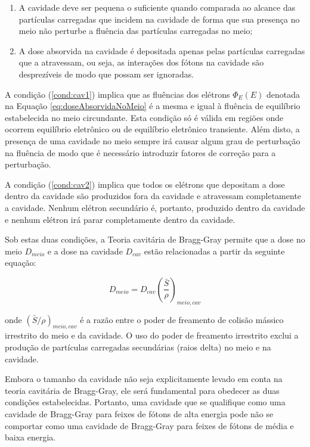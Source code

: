 \documentclass[11pt,a4paper]{article}
\begin{document}
			\begin{enumerate}
				\item A cavidade deve ser pequena o suficiente quando comparada ao alcance das partículas carregadas que incidem na cavidade de forma que sua presença no meio não perturbe a fluência das partículas carregadas no meio;\label{cond:cav1}
				\item A dose absorvida na cavidade é depositada apenas pelas partículas carregadas que a atravessam, ou seja, as interações dos fótons na cavidade são desprezíveis de modo que possam ser ignoradas.\label{cond:cav2}
			\end{enumerate}


			A condição (\ref{cond:cav1}) implica que as fluências dos elétrons $\Phi_E(E)$ denotada na Equação \ref{eq:doseAbsorvidaNoMeio} é a mesma e  igual à fluência de equilíbrio estabelecida no meio circundante. Esta condição só é válida em regiões onde ocorrem equilíbrio eletrônico ou de equilíbrio eletrônico transiente. Além disto, a presença de uma cavidade no meio sempre irá causar algum grau de perturbação na fluência de modo que é necessário introduzir fatores de correção para a perturbação.

			A condição (\ref{cond:cav2}) implica que todos os elétrons que depositam a dose dentro da cavidade são produzidos fora da cavidade e atravessam completamente a cavidade. Nenhum elétron secundário é, portanto, produzido dentro da cavidade e nenhum elétron irá parar completamente dentro da cavidade. 

			Sob estas duas condições, a Teoria cavitária de Bragg-Gray permite que a dose no meio $D_{meio}$ e a dose na cavidade $D_{cav}$ estão relacionadas a partir da seguinte equação:

				\begin{equation}
					D_{meio} = D_{cav} \left(\frac{\bar{S}}{\rho}\right)_{meio, cav}
				\end{equation}

			\noindent onde $(\bar{S}/\rho)_{meio,cav}$ é a razão entre o poder de freamento de colisão mássico irrestrito do meio e da cavidade. O uso do poder de freamento irrestrito exclui a produção de partículas carregadas secundárias (raios delta) no meio e na cavidade.


			Embora o tamanho da cavidade não seja explicitamente levado em conta na teoria cavitária de Bragg-Gray, ele será fundamental para obedecer as duas condições estabelecidas. Portanto, uma cavidade que se qualifique como uma cavidade de Bragg-Gray para feixes de fótons de alta energia pode não se comportar como uma cavidade de Bragg-Gray para feixes de fótons de média e baixa energia.
\end{document}
